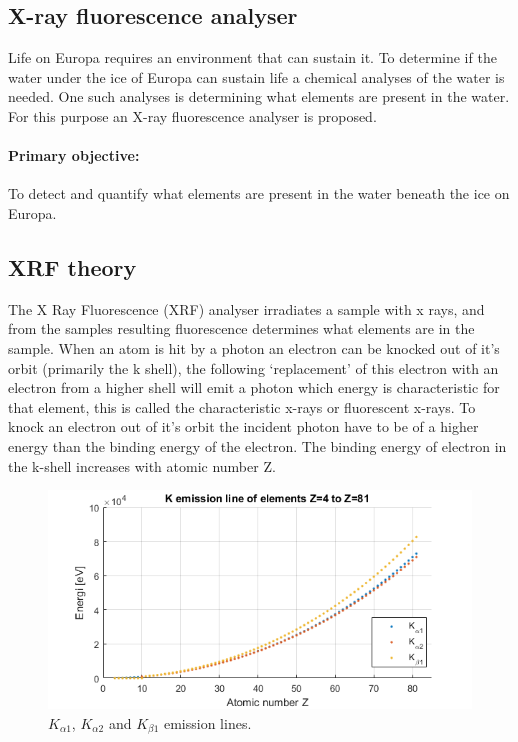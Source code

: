 \subsection{X-ray fluorescence analyser}
Life on Europa requires an environment that can sustain it. To determine if the water under the ice of Europa can sustain life a chemical analyses of the water is needed. One such analyses is determining what elements are present in the water. For this purpose an X-ray fluorescence analyser is proposed.

\paragraph{Primary objective:}
To detect and quantify what elements are present in the water beneath the ice on Europa.


\subsection{XRF theory}

The X Ray Fluorescence (XRF) analyser irradiates a sample with x rays, and from the samples resulting fluorescence determines what elements are in the sample. 
When an atom is hit by a photon an electron can be knocked out of it’s orbit (primarily  the k shell), the following ‘replacement’ of this electron with an electron from a higher shell  will emit a photon which energy is characteristic for that element, this is called the characteristic x-rays or fluorescent x-rays. To knock an electron out of it’s orbit the incident photon have to be of a higher energy than the binding energy of the electron. The binding energy of electron in the k-shell increases with atomic number Z. 

\begin{figure}[h]
	\centering
	\includegraphics[width=\textwidth]{figures/XRF/Kalpha12Lines.png}
	\caption{$K_{\alpha 1}$, $K_{\alpha 2}$ and $K_{\beta 1}$ emission lines.}
	\label{fig:KalphaEmiLines}
\end{figure}

